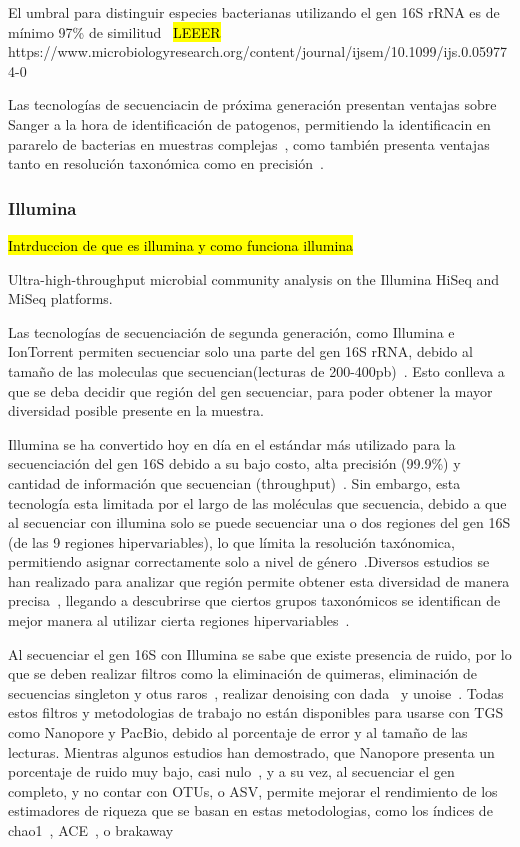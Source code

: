 El umbral para distinguir especies bacterianas utilizando el gen 16S rRNA es de mínimo 97\% de similitud~\cite{kim2014towards}
\hl{LEEER} https://www.microbiologyresearch.org/content/journal/ijsem/10.1099/ijs.0.059774-0


Las tecnologías de secuenciacin de próxima generación presentan ventajas sobre Sanger a la hora de identificación de patogenos, permitiendo la identificacin en pararelo de bacterias en muestras complejas~\cite{peker2019comparison}, como también presenta ventajas tanto en resolución taxonómica como en precisión~\cite{motro2017next}.
\subsubsection{Illumina}
\hl{Intrduccion de que es illumina y como funciona illumina}

Ultra-high-throughput microbial community analysis on the Illumina HiSeq and MiSeq platforms.


Las tecnologías de secuenciación de segunda generación, como Illumina e IonTorrent permiten secuenciar solo una parte del gen 16S rRNA, debido al tamaño de las moleculas que secuencian(lecturas de 200-400pb)~\cite{salipante2014performance}. Esto conlleva a que se deba decidir que región del gen secuenciar, para poder obtener la mayor diversidad posible presente en la muestra. 

Illumina se ha convertido hoy en día en el estándar más utilizado para la secuenciación del gen 16S debido a su bajo costo, alta precisión (99.9\%) y cantidad de información que secuencian (throughput)~\cite{pichler201816s}. Sin embargo, esta tecnología esta limitada por el largo de las moléculas que secuencia, debido a que al secuenciar con illumina solo se puede secuenciar una o dos regiones del gen 16S (de las 9 regiones hipervariables), lo que límita la resolución taxónomica, permitiendo asignar correctamente solo a nivel de género~\cite{johnson2019evaluation}.Diversos estudios se han realizado para analizar que región permite obtener esta diversidad de manera precisa~\cite{liu2008accurate,schloss2011reducing}, llegando a descubrirse que ciertos grupos taxonómicos se identifican de mejor manera al utilizar cierta regiones hipervariables~\cite{he2013comparison,claesson2010comparison}.

Al secuenciar el gen 16S con Illumina se sabe que existe presencia de ruido, por lo que se deben realizar filtros como la eliminación de quimeras, eliminación de secuencias singleton y otus raros~\cite{caporaso2011global,auer2017analysis}, realizar denoising con dada~\cite{callahan2016dada2} y unoise~\cite{edgar2016unoise2}. Todas estos filtros y metodologias de trabajo no están disponibles para usarse con TGS como Nanopore y PacBio, debido al porcentaje de error y al tamaño de las lecturas.
Mientras algunos estudios han demostrado, que Nanopore presenta un porcentaje de ruido muy bajo, casi nulo~\cite{szoboszlay2023nanopore}, y a su vez, al secuenciar el gen completo, y no contar con OTUs, o ASV, permite mejorar el rendimiento de los estimadores de riqueza que se basan en estas metodologias, como los índices de chao1~\cite{chao1984nonparametric}, ACE~\cite{chao1992estimating}, o brakaway~\cite{willis2015estimating}


